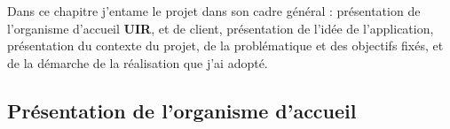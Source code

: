 \documentclass[a4paper]{report}
\begin{document}
\renewcommand{\headrulewidth}{1pt}
\fancyhead[L]{\hspace*{5cm}}
\begin{doublespace}
    Dans ce chapitre j'entame le projet dans son cadre général : présentation
    de l’organisme d’accueil \textbf{UIR},
    et de client, présentation de l'idée de l'application, présentation du
    contexte du projet, de la problématique et des objectifs fixés,
    et de la démarche de la réalisation que j'ai adopté.
\end{doublespace}
\begin{doublespace}
    \section{Présentation de l’organisme d’accueil}

\end{doublespace}
\end{document}
